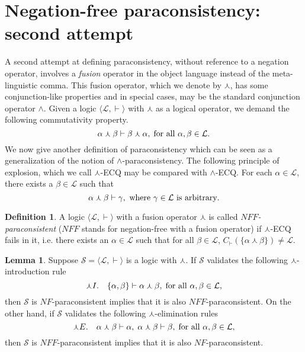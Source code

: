 \documentclass[submission]{eptcs}
\newcommand{\lang}{\mathcal{L}}
\newcommand{\fus}{\curlywedge}
\theoremstyle{definition}
\newtheorem{lem}[thm]{Lemma}
\newtheorem{dfn}[thm]{Definition}
\begin{document}
\section{Negation-free paraconsistency: second attempt}
A second attempt at defining paraconsistency, without reference to a negation operator, involves a \emph{fusion} operator in the object language instead of the meta-linguistic comma. This fusion operator, which we denote by $\fus$, has some conjunction-like properties and in special cases, may be the standard conjunction operator $\land$. Given a logic $\langle\lang,\vdash\rangle$ with $\fus$ as a logical operator, we demand the following commutativity property.
\[
\alpha\fus\beta\vdash\beta\fus\alpha,\;\hbox{for all }\alpha,\beta\in\lang.
\]
We now give another definition of paraconsistency which can be seen as a generalization of the notion of $\land$-paraconsistency. The following principle of explosion, which we call $\fus$-ECQ may be compared with $\land$-ECQ. For each $\alpha\in\lang$, there exists a $\beta\in\lang$ such that
\[
\alpha\fus\beta\vdash\gamma,\hbox{ where }\gamma\in\lang\hbox{ is arbitrary}.
\]

\begin{dfn}
A logic $\langle\lang,\vdash\rangle$ with a fusion operator $\fus$ is called \emph{$NFF$-paraconsistent} ($NFF$ stands for negation-free with a fusion operator) if $\fus$-ECQ fails in it, i.e. there exists an $\alpha\in\lang$ such that for all $\beta\in\lang$, $C_\vdash(\{\alpha\fus\beta\})\neq\lang$.
\end{dfn}

\begin{lem}\label{lem:Fusion}
Suppose $\mathcal{S}=\langle\lang,\vdash\rangle$ is a logic with $\fus$. If $\mathcal{S}$ validates the following $\fus$-introduction rule
\[
\fus I.\quad\{\alpha,\beta\}\vdash\alpha\fus\beta,\;\hbox{for all }\alpha,\beta\in\lang,
\]
then $\mathcal{S}$ is $NF$-paraconsistent implies that it is also $NFF$-paraconsistent. On the other hand, if $\mathcal{S}$ validates the following $\fus$-elimination rules
\[
\fus E.\quad\alpha\fus\beta\vdash\alpha,\;\alpha\fus\beta\vdash\beta,\;\hbox{for all }\alpha,\beta\in\lang,
\]
then $\mathcal{S}$ is $NFF$-paraconsistent implies that it is also $NF$-paraconsistent.
\end{lem}
\end{document}
